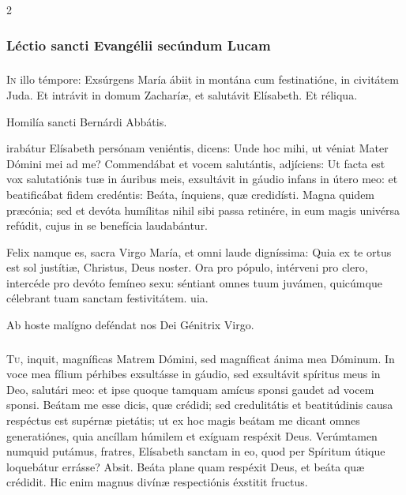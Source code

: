 \documentclass[9pt,twoside]{extarticle}
\begin{document}
\begin{multicols}{2}
\subsubsection*{\center  \normalfont Léctio sancti Evangélii secúndum Lucam}
\subsubsection*{\center {}}
\lettrine{I}n illo témpore: Exsúrgens María ábiit in montána cum festinatióne, in civitátem Juda. Et intrávit in domum Zacharíæ, et salutávit Elísabeth. Et réliqua.

\begin{center}Homilía sancti Bernárdi Abbátis.\\
\end{center}
irabátur Elísabeth persónam veniéntis, dicens: Unde hoc mihi, ut véniat Mater Dómini mei ad me? Commendábat et vocem salutántis, adjíciens: Ut facta est vox salutatiónis tuæ in áuribus meis, exsultávit in gáudio infans in útero meo: et beatificábat fidem credéntis: Beáta, ínquiens, quæ credidísti. Magna quidem præcónia; sed et devóta humílitas nihil sibi passa retinére, in eum magis univérsa refúdit, cujus in se benefícia laudabántur.

\begin{tightlist}{}
\item {} Felix namque es, sacra Virgo María, et omni laude digníssima: \textred{*} Quia ex te ortus est sol justítiæ, Christus, Deus noster.
 Ora pro pópulo, intérveni pro clero, intercéde pro devóto femíneo sexu: séntiant omnes tuum juvámen, quicúmque célebrant tuam sanctam festivitátem. uia.
\item {\small {} Ab hoste malígno deféndat nos Dei Génitrix Virgo.}
\end{tightlist}

\subsubsection*{\center {}}
\lettrine{T}u, inquit, magníficas Matrem Dómini, sed magníficat ánima mea Dóminum. In voce mea fílium pérhibes exsultásse in gáudio, sed exsultávit spíritus meus in Deo, salutári meo: et ipse quoque tamquam amícus sponsi gaudet ad vocem sponsi. Beátam me esse dicis, quæ crédidi; sed credulitátis et beatitúdinis causa respéctus est supérnæ pietátis; ut ex hoc magis beátam me dicant omnes generatiónes, quia ancíllam húmilem et exíguam respéxit Deus. Verúmtamen numquid putámus, fratres, Elísabeth sanctam in eo, quod per Spíritum útique loquebátur errásse? Absit. Beáta plane quam respéxit Deus, et beáta quæ crédidit. Hic enim magnus divínæ respectiónis éxstitit fructus.


\end{multicols}
\end{document}

